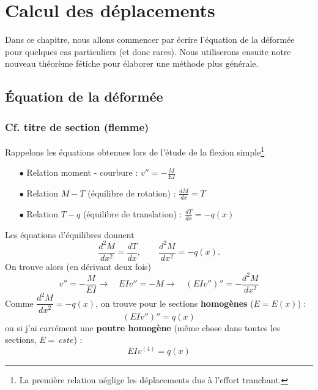 \chapter{Calcul des déplacements}
Dans ce chapitre, nous allons commencer par écrire l'équation de la déformée 
pour quelques cas particuliers (et donc rares). Nous utiliserons ensuite notre 
nouveau théorème fétiche pour élaborer une méthode plus générale.

\section{Équation de la déformée}
	\subsection{Cf. titre de section (flemme)}
	Rappelons les équations obtenues lors de l'étude de la flexion simple\footnote{
	La première relation néglige les déplacements dus à l'effort tranchant.}
	\begin{itemize}
	\item[$\bullet$] Relation moment - courbure : $v'' = -\frac{M}{EI}$
	\item[$\bullet$] Relation $M-T$ (équilibre de rotation) : $\frac{dM}{dx}=T$
	\item[$\bullet$] Relation $T-q$ (équilibre de translation) : $\frac{dT}{dx}
	=-q(x)$
	\end{itemize}
	Les équations d'équilibres donnent 
	\begin{equation}
	\dfrac{d^2M}{dx^2} = \dfrac{dT}{dx},\qquad \dfrac{d^2M}{dx^2}=-q(x).
	\end{equation}
	On trouve alors (en dérivant deux fois)
	\begin{equation}
	v'' = -\dfrac{M}{EI} \longrightarrow \quad EIv'' = -M\longrightarrow \quad 
	(EIv'')'' = -\dfrac{d^2M}{dx^2}
	\end{equation}
	Comme $\dfrac{d^2M}{dx^2} = -q(x)$, on trouve pour le sections 
	\textbf{homogènes} ($E=E(x)$) :
	\begin{equation}
	(EIv'')'' = q(x)
	\end{equation}
	ou si j'ai carrément une \textbf{poutre homogène} (même chose dans toutes 
	les sections, $E =\ cste$) :
	\begin{equation}
	EIv^{(4)} = q(x)
	\end{equation}
	
